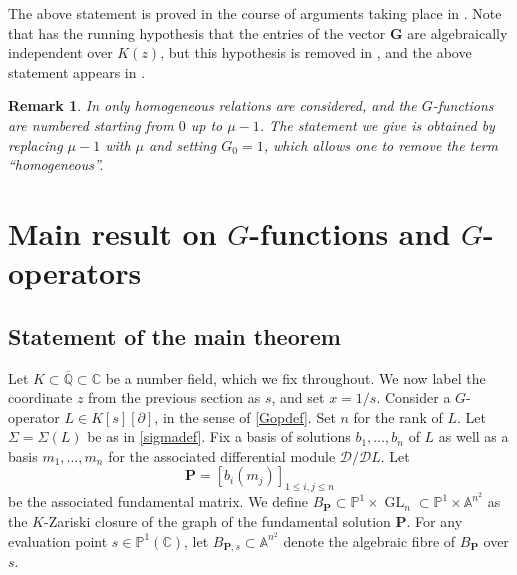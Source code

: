 \documentclass[10pt]{article}
\numberwithin{equation}{section}
\theoremstyle{plain}
\newtheorem{rem}[thm]{Remark}
\theoremstyle{definition}
\theoremstyle{remark}
\newcommand{\GL}{\operatorname{GL}}
\newcommand{\C}{\mathbb{C}}
\newcommand{\Qbar}{\overline{\mathbb{Q}}}
\newcommand{\PP}{\mathbb{P}}
\begin{document}
The above statement is proved in the course of arguments taking place in \cite[VII]{zbMATH00041964}. Note that \cite[VII, \S4.1]{zbMATH00041964} has the running hypothesis that the entries of the vector $\mathbf{G}$ are algebraically independent over $K(z)$, but this hypothesis is removed in \cite[VII, \S4.2]{zbMATH00041964}, and the above statement appears in \cite[VII, \S4.3]{zbMATH00041964}.

\begin{rem}
In \cite[VII, Sec. 4.3]{zbMATH00041964} only \emph{homogeneous} relations are considered, and the $G$-functions are numbered starting from $0$ up to $\mu - 1$. The statement we give is obtained by replacing $\mu-1$ with $\mu$ and setting $G_{0} = 1$, which allows one to remove the term ``homogeneous''. 
\end{rem}




\section{Main result on $G$-functions and $G$-operators}\label{Gresult}

\subsection{Statement of the main theorem}
\label{Gresultstatementsec}

Let $K \subset \Qbar \subset \C$ be a number field, which we fix throughout. We now label the coordinate $z$ from the previous section as $s$, and set $x = 1/s$. Consider a $G$-operator $L\in K[s][\partial]$, in the sense of \autoref{Gopdef}. Set $n$ for the rank of $L$. Let $\Sigma = \Sigma(L)$ be as in \autoref{sigmadef}. Fix a basis of solutions $b_{1}, \hdots, b_{n}$ of $L$ as well as a basis $m_{1}, \hdots, m_{n}$ for the associated differential module $\mathcal{D} / \mathcal{D} L$. Let 
\begin{equation}\label{basisorigi}
    \mathbf{P} = [b_{i}(m_{j})]_{1 \leq i, j \leq n}
\end{equation}
be the associated fundamental matrix. We define $B_\mathbf{P} \subset \mathbb{P}^1 \times \GL_{n} \subset \mathbb{P}^1 \times \mathbb{A}^{n^2}$ as the $K$-Zariski closure of the graph of the fundamental solution $\mathbf{P}$. For any evaluation point $s \in \PP^1(\C)$, let $B_{\mathbf{P}, s} \subset \mathbb{A}^{n^2}$ denote the algebraic fibre of $B_\mathbf{P}$ over $s$. 
\end{document}
